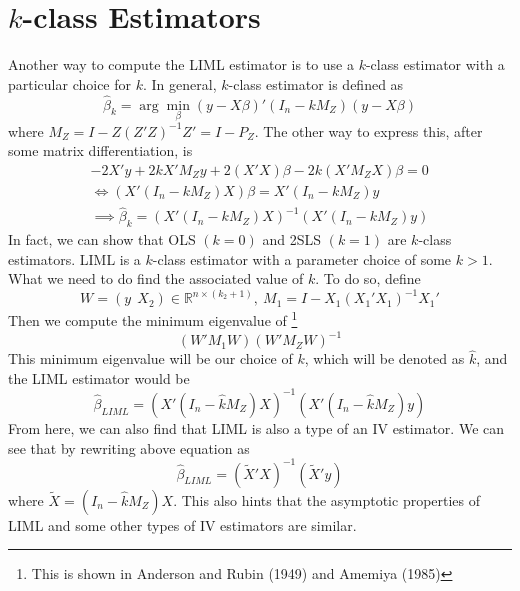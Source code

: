 \section{$k$-class Estimators}
Another way to compute the LIML estimator is to use a $k$-class estimator with a particular choice for $k$. In general, $k$-class estimator is defined as 
\[
\hat{\beta}_k=\arg\min_\beta(y-X\beta)'(I_n-kM_Z)(y-X\beta)
\]
where $M_Z = I-Z(Z'Z)^{-1}Z'=I-P_Z$. The other way to express this, after some matrix differentiation, is 
\begin{gather*}
-2X'y+2kX'M_Zy+2(X'X)\beta-2k(X'M_ZX)\beta=0\\
\iff (X'(I_n-kM_Z)X)\beta=X'(I_n-kM_Z)y\\
\implies \hat{\beta}_k= (X'(I_n-kM_Z)X)^{-1}(X'(I_n-kM_Z)y)
\end{gather*}
In fact, we can show that OLS $(k=0)$ and 2SLS $(k=1)$ are $k$-class estimators. LIML is a $k$-class estimator with a parameter choice of some $k>1$. What we need to do find the associated value of $k$. To do so, define
\[
W=(y\ \ X_2)\in \mathbb{R}^{n\times (k_2+1)}, \ M_1 = I- X_1(X_1'X_1)^{-1}X_1'
\]
Then we compute the minimum eigenvalue of \footnote{This is shown in Anderson and Rubin (1949) and Amemiya (1985)}
\[
(W'M_1W)(W'M_ZW)^{-1}
\]
This minimum eigenvalue will be our choice of $k$, which will be denoted as $\hat{k}$, and the LIML estimator would be
\[
\hat{\beta}_{LIML}=(X'(I_n-\hat{k}M_Z)X)^{-1}(X'(I_n-\hat{k}M_Z)y)
\]
From here, we can also find that LIML is also a type of an IV estimator. We can see that by rewriting above equation as
\[
\hat{\beta}_{LIML}=(\tilde{X}'X)^{-1}(\tilde{X}'y)
\]
where $\tilde{X}=(I_n-\hat{k}M_Z)X$. This also hints that the asymptotic properties of LIML and some other types of IV estimators are similar. 
